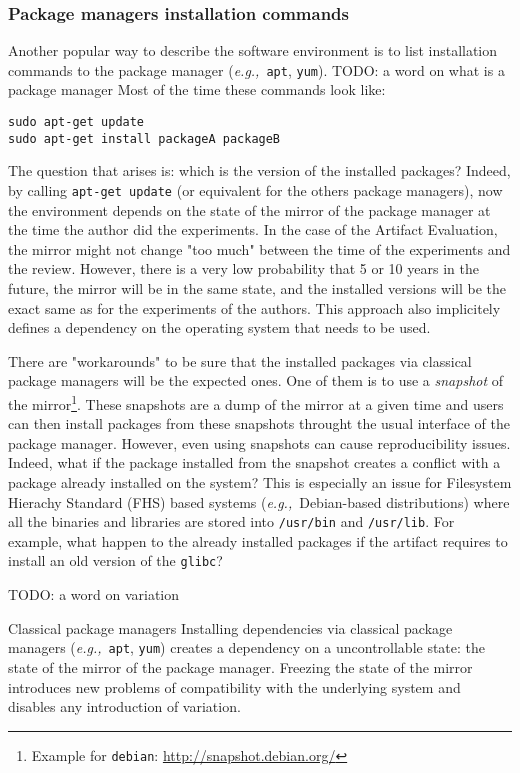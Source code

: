 \documentclass[sigconf]{acmart}
\newcommand{\eg}{\emph{e.g.,}}
\newcommand{\aeval}{Artifact Evaluation}
\newcommand{\todo}[1]{{\color{red}TODO: #1}}
\begin{document}
\subsubsection{Package managers installation commands}

Another popular way to describe the software environment is to list installation commands to the package manager (\eg\ \texttt{apt}, \texttt{yum}).
\todo{a word on what is a package manager}
Most of the time these commands look like:

\begin{verbatim}
sudo apt-get update
sudo apt-get install packageA packageB
\end{verbatim}

The question that arises is: which is the version of the installed packages?
Indeed, by calling \texttt{apt-get update} (or equivalent for the others package managers), now the environment depends on the state of the mirror of the package manager at the time the author did the experiments.
In the case of the \aeval, the mirror might not change "too much" between the time of the experiments and the review.
However, there is a very low probability that 5 or 10 years in the future, the mirror will be in the same state, and the installed versions will be the exact same as for the experiments of the authors.
This approach also implicitely defines a dependency on the operating system that needs to be used.

There are "workarounds" to be sure that the installed packages via classical package managers will be the expected ones. 
One of them is to use a \emph{snapshot} of the mirror\footnote{Example for \texttt{debian}: \url{http://snapshot.debian.org/}}.
These snapshots are a dump of the mirror at a given time and users can then install packages from these snapshots throught the usual interface of the package manager.
However, even using snapshots can cause reproducibility issues.
Indeed, what if the package installed from the snapshot creates a conflict with a package already installed on the system?
This is especially an issue for Filesystem Hierachy Standard (FHS) based systems (\eg\ Debian-based distributions) where all the binaries and libraries are stored into \texttt{/usr/bin} and \texttt{/usr/lib}.
For example, what happen to the already installed packages if the artifact requires to install an old version of the \texttt{glibc}? 

\todo{a word on variation}


\begin{lesson}{Classical package managers}{}
  Installing dependencies via classical package managers (\eg\ \texttt{apt}, \texttt{yum}) creates a dependency on a uncontrollable state: the state of the mirror of the package manager.
  Freezing the state of the mirror introduces new problems of compatibility with the underlying system and disables any introduction of variation.
\end{lesson}
\end{document}
